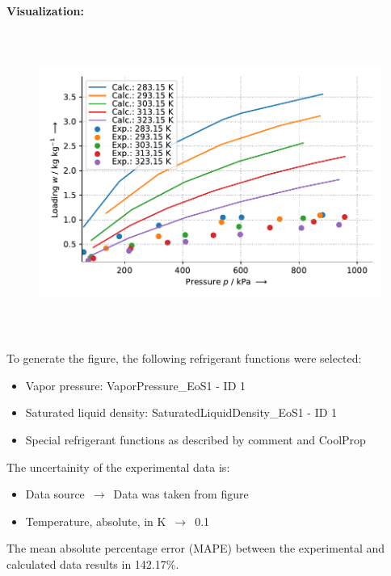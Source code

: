 \textbf{Visualization:}
%
\begin{figure}[!htp]
{\noindent\includegraphics[height=10cm, keepaspectratio]{figs/ads/ads_R-410a_activated_carbon_fiber_A-20_DubininAstakhov_1.pdf}}
\end{figure}
%

To generate the figure, the following refrigerant functions were selected:
\begin{itemize}
\item Vapor pressure: VaporPressure\_EoS1 - ID 1
\item Saturated liquid density: SaturatedLiquidDensity\_EoS1 - ID 1
\item Special refrigerant functions as described by comment and CoolProp
\end{itemize}

The uncertainity of the experimental data is:
\begin{itemize}
\item Data source $\,\to\,$ Data was taken from figure
\item Temperature, absolute, in $\si{\kelvin}$ $\,\to\,$ 0.1
\end{itemize}

The mean absolute percentage error (MAPE) between the experimental and calculated data results in 142.17\%.
\FloatBarrier
\newpage
